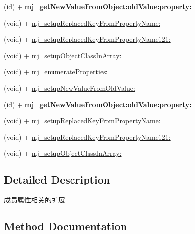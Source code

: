 \begin{DoxyCompactItemize}
(id) + {\bfseries mj\+\_\+get\+New\+Value\+From\+Object\+:old\+Value\+:property\+:}
\item 
(void) + \mbox{\hyperlink{category_n_s_object_07_m_j_property_08_a1883e0f76733827afe0a1855d8bfb6f8}{mj\+\_\+setup\+Replaced\+Key\+From\+Property\+Name\+:}}
\item 
(void) + \mbox{\hyperlink{category_n_s_object_07_m_j_property_08_a65ca79a4eb9d05d554c0420b95afe471}{mj\+\_\+setup\+Replaced\+Key\+From\+Property\+Name121\+:}}
\item 
(void) + \mbox{\hyperlink{category_n_s_object_07_m_j_property_08_a7344a44c53e0991f3bbb1b199d47a4ea}{mj\+\_\+setup\+Object\+Class\+In\+Array\+:}}
\item 
(void) + \mbox{\hyperlink{category_n_s_object_07_m_j_property_08_a7fd9ddf78a279a82eaac01b08f6d6a1c}{mj\+\_\+enumerate\+Properties\+:}}
\item 
(void) + \mbox{\hyperlink{category_n_s_object_07_m_j_property_08_a21b9a2a1d0a5d0c73fdeb7a5bbe953e8}{mj\+\_\+setup\+New\+Value\+From\+Old\+Value\+:}}
\item 
\mbox{\label{category_n_s_object_07_m_j_property_08_a65b32eb9f057b419969182da0816062b}} 
(id) + {\bfseries mj\+\_\+get\+New\+Value\+From\+Object\+:old\+Value\+:property\+:}
\item 
(void) + \mbox{\hyperlink{category_n_s_object_07_m_j_property_08_a1883e0f76733827afe0a1855d8bfb6f8}{mj\+\_\+setup\+Replaced\+Key\+From\+Property\+Name\+:}}
\item 
(void) + \mbox{\hyperlink{category_n_s_object_07_m_j_property_08_a65ca79a4eb9d05d554c0420b95afe471}{mj\+\_\+setup\+Replaced\+Key\+From\+Property\+Name121\+:}}
\item 
(void) + \mbox{\hyperlink{category_n_s_object_07_m_j_property_08_a7344a44c53e0991f3bbb1b199d47a4ea}{mj\+\_\+setup\+Object\+Class\+In\+Array\+:}}
\end{DoxyCompactItemize}


\subsection{Detailed Description}
成员属性相关的扩展 

\subsection{Method Documentation}
\mbox{\label{category_n_s_object_07_m_j_property_08_a7fd9ddf78a279a82eaac01b08f6d6a1c}} 
